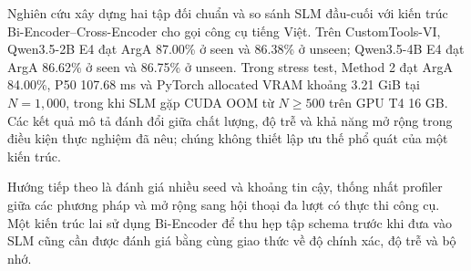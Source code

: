 \documentclass[10pt,twocolumn,a4paper]{article}
\begin{document}
Nghiên cứu xây dựng hai tập đối chuẩn và so sánh SLM đầu-cuối với kiến trúc Bi-Encoder--Cross-Encoder cho gọi công cụ tiếng Việt. Trên CustomTools-VI, Qwen3.5-2B E4 đạt ArgA 87.00\% ở seen và 86.38\% ở unseen; Qwen3.5-4B E4 đạt ArgA 86.62\% ở seen và 86.75\% ở unseen. Trong stress test, Method 2 đạt ArgA 84.00\%, P50 107.68 ms và PyTorch allocated VRAM khoảng 3.21 GiB tại $N=1{,}000$, trong khi SLM gặp CUDA OOM từ $N \geq 500$ trên GPU T4 16 GB. Các kết quả mô tả đánh đổi giữa chất lượng, độ trễ và khả năng mở rộng trong điều kiện thực nghiệm đã nêu; chúng không thiết lập ưu thế phổ quát của một kiến trúc.

Hướng tiếp theo là đánh giá nhiều seed và khoảng tin cậy, thống nhất profiler giữa các phương pháp và mở rộng sang hội thoại đa lượt có thực thi công cụ. Một kiến trúc lai sử dụng Bi-Encoder để thu hẹp tập schema trước khi đưa vào SLM cũng cần được đánh giá bằng cùng giao thức về độ chính xác, độ trễ và bộ nhớ.





\end{document}

